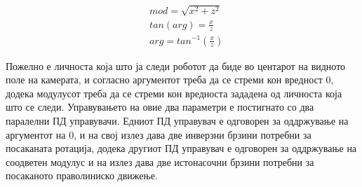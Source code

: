 \documentclass[11pt]{article}
\begin{document}
      \begin{align} \label{eq:cart2pol}
    	   & mod = \sqrt{x^{2} + z^{2}} \nonumber \\
         & tan(arg) = \frac{x}{z} \nonumber\\
         & arg = tan^{-1}(\frac{x}{z})
      \end{align}

      Пожелно е личноста која што ја следи роботот да биде во центарот на видното поле на камерата, и согласно аргументот треба да се стреми кон вредност 0, додека модулусот треба да се стреми кон вредноста зададена од личноста која што се следи. Управувањето на овие два параметри е постигнато со два паралелни ПД управувачи. Едниот ПД управувач е одговорен за оддржување на аргументот на 0, и на свој излез дава две инверзни брзини потребни за посаканата ротација, додека другиот ПД управувач е одговорен за оддржување на соодветен модулус и на излез дава две истонасочни брзини потребни за посаканото праволиниско движење.
\end{document}
